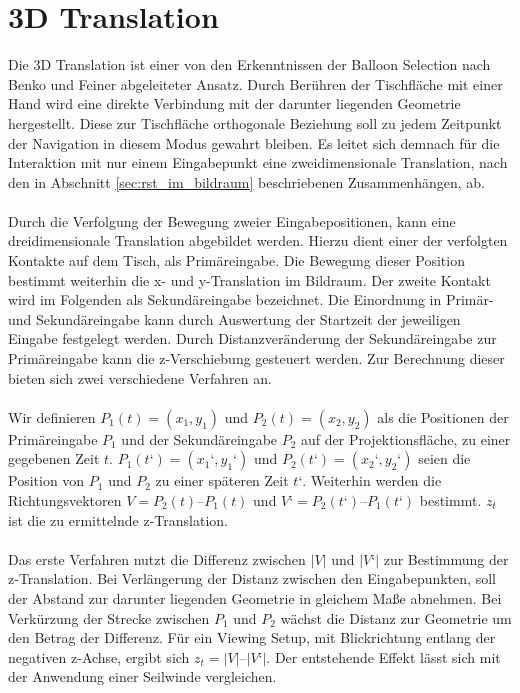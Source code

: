 \section{3D Translation}
\label{sec:3d_translation}

Die 3D Translation ist einer von den Erkenntnissen der Balloon Selection nach Benko und Feiner \cite{benko:2007} abgeleiteter Ansatz. Durch Berühren  der Tischfläche mit einer Hand wird eine direkte Verbindung mit der darunter liegenden Geometrie hergestellt. Diese zur Tischfläche orthogonale Beziehung soll zu jedem Zeitpunkt der Navigation in diesem Modus gewahrt bleiben. Es leitet sich demnach für die Interaktion mit nur einem Eingabepunkt eine zweidimensionale Translation, nach den in Abschnitt \ref{sec:rst_im_bildraum} beschriebenen Zusammenhängen, ab.
\\\\
Durch die Verfolgung der Bewegung zweier Eingabepositionen, kann eine dreidimensionale Translation abgebildet werden. Hierzu dient einer der verfolgten Kontakte auf dem Tisch, als Primäreingabe. Die Bewegung dieser Position bestimmt weiterhin die x- und y-Translation im Bildraum. Der zweite Kontakt wird im Folgenden als Sekundäreingabe bezeichnet. Die Einordnung in Primär- und Sekundäreingabe kann durch Auswertung der Startzeit der jeweiligen Eingabe festgelegt werden. Durch Distanzveränderung der Sekundäreingabe zur Primäreingabe kann die z-Verschiebung gesteuert werden. Zur Berechnung dieser bieten sich zwei verschiedene Verfahren an.
\\\\
Wir definieren $P_1(t) = (x_1, y_1)$ und $P_2(t) = (x_2, y_2)$ als die Positionen der Primäreingabe $P_1$ und der Sekundäreingabe $P_2$ auf der Projektionsfläche, zu einer gegebenen Zeit $t$. $P_1(t‘) = (x_1‘, y_1‘)$ und $P_2(t‘) = (x_2‘, y_2‘)$  seien die Position von $P_1$ und $P_2$ zu einer späteren Zeit $t‘$. Weiterhin werden die Richtungsvektoren $V = P_2(t) – P_1(t)$ und $V‘ = P_2(t‘) – P_1(t‘)$ bestimmt. $z_t$ ist die zu ermittelnde z-Translation.
\\\\
Das erste Verfahren nutzt die Differenz zwischen $|V|$ und $|V‘|$ zur Bestimmung der z-Translation. Bei Verlängerung der Distanz zwischen den Eingabepunkten, soll der Abstand zur darunter liegenden Geometrie in gleichem Maße abnehmen. Bei Verkürzung der Strecke zwischen $P_1$ und $P_2$ wächst die Distanz zur Geometrie um den Betrag der Differenz. Für ein Viewing Setup, mit Blickrichtung entlang der negativen z-Achse, ergibt sich $z_t = |V| – |V‘|$. Der entstehende Effekt lässt sich mit der Anwendung einer Seilwinde vergleichen.
